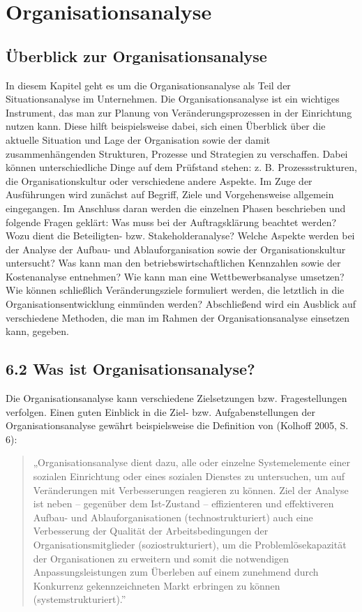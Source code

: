 \documentclass[
  letterpaper,
]{book}
\begin{document}
\chapter{Organisationsanalyse}\label{organisationsanalyse}

\section{Überblick zur
Organisationsanalyse}\label{berblick-zur-organisationsanalyse}

In diesem Kapitel geht es um die Organisationsanalyse als Teil der
Situationsanalyse im Unternehmen. Die Organisationsanalyse ist ein
wichtiges Instrument, das man zur Planung von Veränderungsprozessen in
der Einrichtung nutzen kann. Diese hilft beispielsweise dabei, sich
einen Überblick über die aktuelle Situation und Lage der Organisation
sowie der damit zusammenhängenden Strukturen, Prozesse und Strategien zu
verschaffen. Dabei können unterschiedliche Dinge auf dem Prüfstand
stehen: z. B. Prozessstrukturen, die Organisationskultur oder
verschiedene andere Aspekte. Im Zuge der Ausführungen wird zunächst auf
Begriff, Ziele und Vorgehensweise allgemein eingegangen. Im Anschluss
daran werden die einzelnen Phasen beschrieben und folgende Fragen
geklärt: Was muss bei der Auftragsklärung beachtet werden? Wozu dient
die Beteiligten- bzw. Stakeholderanalyse? Welche Aspekte werden bei der
Analyse der Aufbau- und Ablauforganisation sowie der Organisationskultur
untersucht? Was kann man den betriebswirtschaftlichen Kennzahlen sowie
der Kostenanalyse entnehmen? Wie kann man eine Wettbewerbsanalyse
umsetzen? Wie können schließlich Veränderungsziele formuliert werden,
die letztlich in die Organisationsentwicklung einmünden werden?
Abschließend wird ein Ausblick auf verschiedene Methoden, die man im
Rahmen der Organisationsanalyse einsetzen kann, gegeben.

\section{6.2 Was ist
Organisationsanalyse?}\label{was-ist-organisationsanalyse}

Die Organisationsanalyse kann verschiedene Zielsetzungen bzw.
Fragestellungen verfolgen. Einen guten Einblick in die Ziel- bzw.
Aufgabenstellungen der Organisationsanalyse gewährt beispielsweise die
Definition von (Kolhoff 2005, S. 6):

\begin{quote}
„Organisationsanalyse dient dazu, alle oder einzelne Systemelemente
einer sozialen Einrichtung oder eines sozialen Dienstes zu untersuchen,
um auf Veränderungen mit Verbesserungen reagieren zu können. Ziel der
Analyse ist neben -- gegenüber dem Ist-Zustand -- effizienteren und
effektiveren Aufbau- und Ablauforganisationen (technostrukturiert) auch
eine Verbesserung der Qualität der Arbeitsbedingungen der
Organisationsmitglieder (soziostrukturiert), um die Problemlösekapazität
der Organisationen zu erweitern und somit die notwendigen
Anpassungsleistungen zum Überleben auf einem zunehmend durch Konkurrenz
gekennzeichneten Markt erbringen zu können (systemstrukturiert).''
\end{quote}
\end{document}

